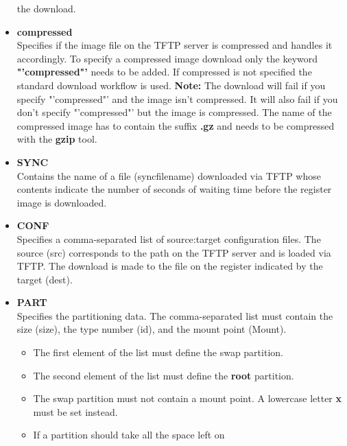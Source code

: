 \begin{itemize}
                  the download.
			\item \textbf{compressed}\\
                  Specifies if the image file on the TFTP server is compressed and
                  handles it accordingly. To specify a compressed image download only
                  the keyword \textbf{"'compressed"'} needs to be added. If compressed
                  is not specified the standard download workflow is used. \textbf{Note:}
                  The download will fail if you specify "'compressed"' and the image isn't
                  compressed. It will also fail if you don't specify "'compressed"'
                  but the image is compressed. The name of the compressed image has
                  to contain the suffix \textbf{.gz} and needs to be compressed with the
                  \textbf{gzip} tool.
		    \item \textbf{SYNC}\\
                  Contains the name of a file (syncfilename) downloaded
                  via TFTP whose contents indicate the number of seconds of
                  waiting time before the register image is downloaded.
            \item \textbf{CONF}\\
                  Specifies a comma-separated list of source:target
                  configuration files. The source (src) corresponds to the path
                  on the TFTP server and is loaded via TFTP. The
                  download is made to the file on the register
                  indicated by the target
                  (dest).
            \item \textbf{PART}\\
                  Specifies the partitioning data. The comma-separated list
                  must contain the size (size), the type number (id), and the
                  mount point (Mount).
                  \begin{itemize}
                  \item The first element of the list must define the swap
                        partition.
                  \item The second element of the list must define the
                        \textbf{root} partition.
                  \item The swap partition must not contain a mount point.
                        A lowercase letter \textbf{x} must be set instead.
                  \item If a partition should take all the space left on

\end{itemize}
\end{itemize}
